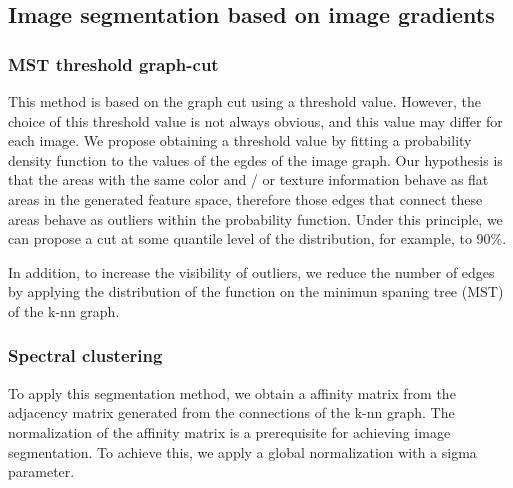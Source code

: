 \subsection{Image segmentation based on image gradients}
\subsubsection{MST threshold graph-cut}
This method is based on the graph cut using a threshold value. However, the choice of this threshold value is not always obvious, and this value may differ for each image.
We propose obtaining a threshold value by fitting a probability density function to the values of the egdes of the image graph. Our hypothesis is that the areas with the same color and / or texture information behave as flat areas in the generated feature space, therefore those edges that connect these areas behave as outliers within the probability function. Under this principle, we can propose a cut at some quantile level of the distribution, for example, to 90\%.

In addition, to increase the visibility of outliers, we reduce the number of edges by applying the distribution of the function on the minimun spaning tree (MST) of the k-nn graph.

%


\subsubsection{Spectral clustering}
To apply this segmentation method, we obtain a affinity matrix from the adjacency matrix generated from the connections of the k-nn graph. The normalization of the affinity matrix is a prerequisite for achieving image segmentation. To achieve this, we apply a global normalization with a sigma parameter.

